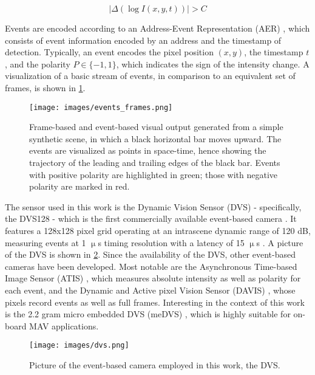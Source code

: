 \begin{equation}
\label{eq:event_threshold}
\lvert\Delta\left(\log I\left(x,y,t\right)\right)\rvert > C
\end{equation}

Events are encoded according to an Address-Event Representation (AER) \cite{Lichtsteiner2008}, which consists of event information encoded by an address and the timestamp of detection. Typically, an event encodes the pixel position $(x,y)$, the timestamp $t$, and the polarity $P\in\lbrace-1,1\rbrace$, which indicates the sign of the intensity change. A visualization of a basic stream of events, in comparison to an equivalent set of frames, is shown in \cref{fig:events_frames}.

\begin{figure}[!htpb]
	\centering
	\texttt{[image: images/events\_frames.png]}
	\caption{Frame-based and event-based visual output generated from a simple synthetic scene, in which a black horizontal bar moves upward. The events are visualized as points in space-time, hence showing the trajectory of the leading and trailing edges of the black bar. Events with positive polarity are highlighted in green; those with negative polarity are marked in red.}
	\label{fig:events_frames}
\end{figure}

The sensor used in this work is the Dynamic Vision Sensor (DVS) - specifically, the DVS128 - which is the first commercially available event-based camera \cite{Cho2015}. It features a 128x128 pixel grid operating at an intrascene dynamic range of 120 dB, measuring events at 1 $\upmu$s timing resolution with a latency of 15 $\upmu$s \cite{Lichtsteiner2008}. A picture of the DVS is shown in \cref{fig:dvs}. Since the availability of the DVS, other event-based cameras have been developed. Most notable are the Asynchronous Time-based Image Sensor (ATIS) \cite{Posch2011}, which measures absolute intensity as well as polarity for each event, and the Dynamic and Active pixel Vision Sensor (DAVIS) \cite{Brandli2014}, whose pixels record events as well as full frames. Interesting in the context of this work is the 2.2 gram micro embedded DVS (meDVS) \cite{Conradt2015}, which is highly suitable for on-board MAV applications.

\begin{figure}[!t]
	\centering
	\texttt{[image: images/dvs.png]}
	\caption{Picture of the event-based camera employed in this work, the DVS.}
	\label{fig:dvs}
\end{figure}

